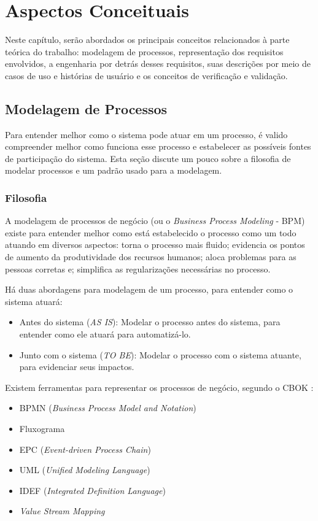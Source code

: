 \chapter{Aspectos Conceituais}\label{chap:aspectos-conceituais}
Neste capítulo, serão abordados os principais conceitos relacionados à parte teórica do trabalho: modelagem de processos, representação dos requisitos envolvidos, a engenharia por detrás desses requisitos, suas descrições por meio de casos de uso e histórias de usuário e os conceitos de verificação e validação.

\section{Modelagem de Processos}
Para entender melhor como o sistema pode atuar em um processo, é valido compreender melhor como funciona esse processo e estabelecer as possíveis fontes de participação do sistema. Esta seção discute um pouco sobre a filosofia de modelar processos e um padrão usado para a modelagem.

\subsection{Filosofia}
A modelagem de processos de negócio (ou o \textit{Business Process Modeling} - BPM) existe para entender melhor como está estabelecido o processo como um todo atuando em diversos aspectos: torna o processo mais fluido; evidencia os pontos de aumento da produtividade dos recursos humanos; aloca problemas para as pessoas corretas e; simplifica as regularizações necessárias no processo\cite{mikehavey2015}.

Há duas abordagens para modelagem de um processo, para entender como o sistema atuará\cite{jessicaangeli2018}:

\begin{itemize}
    \item Antes do sistema (\textit{AS IS}): Modelar o processo antes do sistema, para entender como ele atuará para automatizá-lo.
    \item Junto com o sistema (\textit{TO BE}): Modelar o processo com o sistema atuante, para evidenciar seus impactos.
\end{itemize}

Existem ferramentas para representar os processos de negócio, segundo o CBOK \cite[cap. ~3, p. 79]{cbok2013}:

\begin{itemize}
    \item BPMN (\textit{Business Process Model and Notation})
    \item Fluxograma
    \item EPC (\textit{Event-driven Process Chain})
    \item UML (\textit{Unified Modeling Language})
    \item IDEF (\textit{Integrated Definition Language})
    \item \textit{Value Stream Mapping}
\end{itemize}


